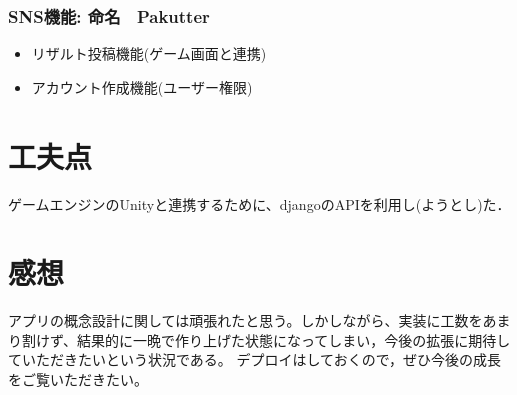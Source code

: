 \documentclass[a4j]{jarticle}
\begin{document}
\subsubsection*{SNS機能: 命名　Pakutter}
\begin{itemize}  
  \item リザルト投稿機能(ゲーム画面と連携)
  \item アカウント作成機能(ユーザー権限)
\end{itemize}

\section{工夫点}
ゲームエンジンのUnityと連携するために、djangoのAPIを利用し(ようとし)た．
\section{感想}
アプリの概念設計に関しては頑張れたと思う。しかしながら、実装に工数をあまり割けず、結果的に一晩で作り上げた状態になってしまい，今後の拡張に期待していただきたいという状況である。
デプロイはしておくので，ぜひ今後の成長をご覧いただきたい。
\end{document}
